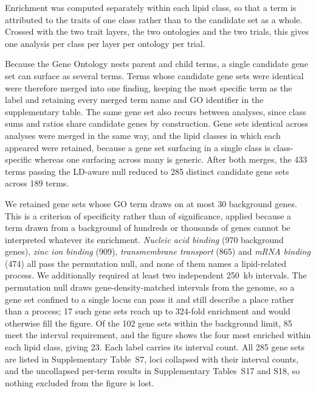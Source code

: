 \documentclass[9pt,twocolumn,twoside]{rilabRxiv}
\begin{document}
Enrichment was computed separately within each lipid class, so that a term is attributed to the traits of one class rather than to the candidate set as a whole. Crossed with the two trait layers, the two ontologies and the two trials, this gives one analysis per class per layer per ontology per trial.

Because the Gene Ontology nests parent and child terms, a single candidate gene set can surface as several terms. Terms whose candidate gene sets were identical were therefore merged into one finding, keeping the most specific term as the label and retaining every merged term name and GO identifier in the supplementary table. The same gene set also recurs between analyses, since class sums and ratios share candidate genes by construction. Gene sets identical across analyses were merged in the same way, and the lipid classes in which each appeared were retained, because a gene set surfacing in a single class is class-specific whereas one surfacing across many is generic. After both merges, the 433 terms passing the LD-aware null reduced to 285 distinct candidate gene sets across 189 terms.

We retained gene sets whose GO term draws on at most 30 background genes. This is a criterion of specificity rather than of significance, applied because a term drawn from a background of hundreds or thousands of genes cannot be interpreted whatever its enrichment. \textit{Nucleic acid binding} (970 background genes), \textit{zinc ion binding} (909), \textit{transmembrane transport} (865) and \textit{mRNA binding} (474) all pass the permutation null, and none of them names a lipid-related process. We additionally required at least two independent 250~kb intervals. The permutation null draws gene-density-matched intervals from the genome, so a gene set confined to a single locus can pass it and still describe a place rather than a process; 17 such gene sets reach up to 324-fold enrichment and would otherwise fill the figure. Of the 102 gene sets within the background limit, 85 meet the interval requirement, and the figure shows the four most enriched within each lipid class, giving 23. Each label carries its interval count. All 285 gene sets are listed in Supplementary Table~S7, loci collapsed with their interval counts, and the uncollapsed per-term results in Supplementary Tables~S17 and S18, so nothing excluded from the figure is lost.
\end{document}

